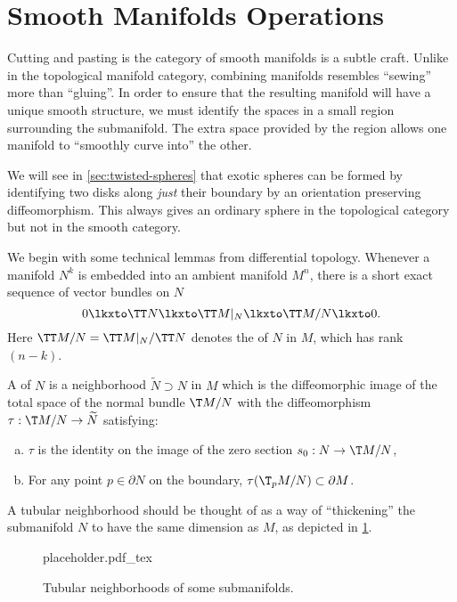 \pagebreak
\section{Smooth Manifolds Operations}\label{sec:smooth-manifold-operations}

Cutting and pasting is the category of smooth manifolds is a subtle craft. 
Unlike in the topological manifold category, combining manifolds resembles ``sewing'' more than ``gluing''. In order to ensure that the resulting manifold will have a unique smooth structure, we must identify the spaces in a small region surrounding the submanifold. The extra space provided by the region allows one manifold to ``smoothly curve into'' the other.

\begin{remark} 
	We will see in \cref{sec:twisted-spheres} that exotic spheres can be formed by identifying two disks along \emph{just} their boundary by an orientation preserving diffeomorphism. This always gives an ordinary sphere in the topological category but not in the smooth category.
\end{remark}

We begin with some technical lemmas from differential topology. Whenever a manifold $N^k$ is embedded into an ambient manifold $M^n$, there is a short exact sequence of vector bundles on $N$
\begin{equation}
	0 \lkxto \TT N\lkxto \TT M|_N \lkxto \TT M/N \lkxto 0.
\end{equation}
Here $\TT M/N=\TT M|_N / \TT N$ denotes the  of $N$ in $M$, which has rank $(n-k)$.

A  of $N$ is a neighborhood $\widetilde{N}\supset N$ in $M$ which is the diffeomorphic image of the total space of the normal bundle $\T M/N$ with the diffeomorphism $\tau : \T M/N \to \widetilde{N}$ satisfying:
\begin{enumerate}[(a)]
	\item $\tau$ is the identity on the image of the zero section $s_0 : N \to \T M/N$,
	\item For any point $p\in \partial N$ on the boundary, $\tau(\T_p M/N)\subset \partial M$.
\end{enumerate}


A tubular neighborhood should be thought of as a way of ``thickening'' the submanifold $N$ to have the same dimension as $M$, as depicted in \cref{fig:tubular-neighborhood}. 

\begin{figure}[ht]
	\centering
	{placeholder.pdf_tex}
	\caption{Tubular neighborhoods of some submanifolds.}\label{fig:tubular-neighborhood}
\end{figure}

